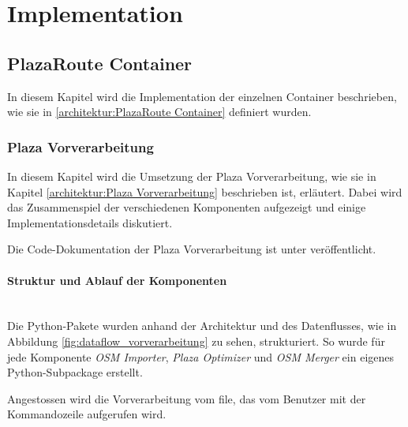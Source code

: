 
\section{Implementation}
\label{sec:Implementation}

\subsection{PlazaRoute Container}
\label{impl:PlazaRoute Container}

In diesem Kapitel wird die Implementation der einzelnen Container beschrieben, wie sie in \ref{architektur:PlazaRoute Container} definiert wurden.

\subsubsection{Plaza Vorverarbeitung}
\label{impl:Plaza Vorverarbeitung}

In diesem Kapitel wird die Umsetzung der Plaza Vorverarbeitung, wie sie in Kapitel \ref{architektur:Plaza Vorverarbeitung} beschrieben ist, erläutert. Dabei wird das Zusammenspiel der verschiedenen Komponenten aufgezeigt und einige Implementationsdetails diskutiert.

Die Code-Dokumentation der Plaza Vorverarbeitung ist unter \cite{PlazaRoute-apidoc} veröffentlicht.

\paragraph{Struktur und Ablauf der Komponenten} \label{impl:Struktur der Komponenten} ~\\
Die Python-Pakete wurden anhand der Architektur und des Datenflusses, wie in Abbildung \ref{fig:dataflow_vorverarbeitung} zu sehen, strukturiert. So wurde für jede Komponente \emph{OSM Importer}, \emph{Plaza Optimizer} und \emph{OSM Merger} ein eigenes Python-Subpackage erstellt.

Angestossen wird die Vorverarbeitung vom  file, das vom Benutzer mit der Kommandozeile aufgerufen wird.

